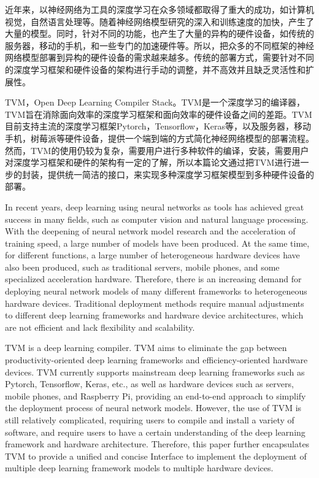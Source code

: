 
\begin{cabstract}
近年来，以神经网络为工具的深度学习在众多领域都取得了重大的成功，如计算机视觉，自然语言处理等。随着神经网络模型研究的深入和训练速度的加快，产生了大量的模型。同时，针对不同的功能，也产生了大量的异构的硬件设备，如传统的服务器，移动的手机，和一些专门的加速硬件等。所以，把众多的不同框架的神经网络模型部署到异构的硬件设备的需求越来越多。传统的部署方式，需要针对不同的深度学习框架和硬件设备的架构进行手动的调整，并不高效并且缺乏灵活性和扩展性。

TVM，Open Deep Learning Compiler Stack。TVM是一个深度学习的编译器，TVM旨在消除面向效率的深度学习框架和面向效率的硬件设备之间的差距。TVM目前支持主流的深度学习框架Pytorch，Tensorflow，Keras等，以及服务器，移动手机，树莓派等硬件设备，提供一个端到端的方式简化神经网络模型的部署流程。然而，TVM的使用仍较为复杂，需要用户进行多种软件的编译，安装，需要用户对深度学习框架和硬件的架构有一定的了解，所以本篇论文通过把TVM进行进一步的封装，提供统一简洁的接口，来实现多种深度学习框架模型到多种硬件设备的部署。
\end{cabstract}

\begin{eabstract}
In recent years, deep learning using neural networks as tools has achieved great success in many fields, such as computer vision and natural language processing. With the deepening of neural network model research and the acceleration of training speed, a large number of models have been produced. At the same time, for different functions, a large number of heterogeneous hardware devices have also been produced, such as traditional servers, mobile phones, and some specialized acceleration hardware. Therefore, there is an increasing demand for deploying neural network models of many different frameworks to heterogeneous hardware devices. Traditional deployment methods require manual adjustments to different deep learning frameworks and hardware device architectures, which are not efficient and lack flexibility and scalability.

TVM is a deep learning compiler. TVM aims to eliminate the gap between productivity-oriented deep learning frameworks and efficiency-oriented hardware devices. TVM currently supports mainstream deep learning frameworks such as Pytorch, Tensorflow, Keras, etc., as well as hardware devices such as servers, mobile phones, and Raspberry Pi, providing an end-to-end approach to simplify the deployment process of neural network models. However, the use of TVM is still relatively complicated, requiring users to compile and install a variety of software, and require users to have a certain understanding of the deep learning framework and hardware architecture. Therefore, this paper further encapsulates TVM to provide a unified and concise Interface to implement the deployment of multiple deep learning framework models to multiple hardware devices.
\end{eabstract}